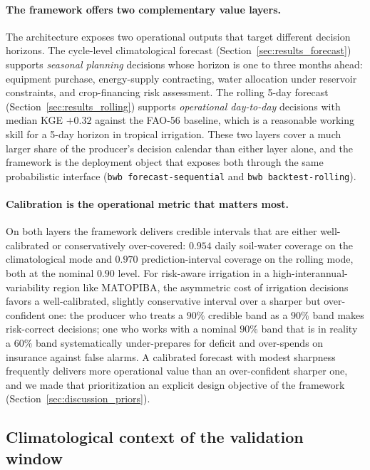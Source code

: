 \documentclass[review,5p,times]{elsarticle}
\begin{document}
\paragraph{The framework offers two complementary value layers.}
The architecture exposes two operational outputs that target
different decision horizons. The cycle-level climatological
forecast (Section~\ref{sec:results_forecast}) supports
\emph{seasonal planning} decisions whose horizon is one to three
months ahead: equipment purchase, energy-supply contracting, water
allocation under reservoir constraints, and crop-financing risk
assessment. The rolling 5-day forecast
(Section~\ref{sec:results_rolling}) supports \emph{operational
day-to-day} decisions with median KGE $+0.32$ against the FAO-56
baseline, which is a reasonable working skill for a 5-day horizon
in tropical irrigation. These two layers cover a much larger share
of the producer's decision calendar than either layer alone, and the
framework is the deployment object that exposes both through the
same probabilistic interface (\verb|bwb forecast-sequential| and
\verb|bwb backtest-rolling|).

\paragraph{Calibration is the operational metric that matters most.}
On both layers the framework delivers credible intervals that are
either well-calibrated or conservatively over-covered: $0.954$
daily soil-water coverage on the climatological mode and $0.970$
prediction-interval coverage on the rolling mode, both at the
nominal $0.90$ level. For risk-aware irrigation in a
high-interannual-variability region like MATOPIBA, the asymmetric
cost of irrigation decisions favors a well-calibrated, slightly
conservative interval over a sharper but over-confident one: the
producer who treats a $90\%$ credible band as a $90\%$ band makes
risk-correct decisions; one who works with a nominal $90\%$ band
that is in reality a $60\%$ band systematically under-prepares for
deficit and over-spends on insurance against false alarms. A
calibrated forecast with modest sharpness frequently delivers more
operational value than an over-confident sharper one, and we made
that prioritization an explicit design objective of the framework
(Section~\ref{sec:discussion_priors}).

\subsection{Climatological context of the validation window}
\end{document}
